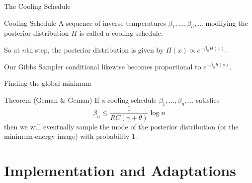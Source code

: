\documentclass[10pt]{beamer}
\begin{document}
\begin{frame}{The Cooling Schedule}

\begin{block}{Cooling Schedule}
A sequence of inverse temperatures $\beta_1,\ldots,\beta_n,\ldots$ modifying the posterior distribution $\Pi$ is called a cooling schedule.

So at $n$th step, the posterior distribution is given by $\Pi(x) \propto e^{-\beta_n H(x)}$.

Our Gibbs Sampler conditional likewise becomes proportional to $e^{-\beta_n h(s)}$.
\end{block}




\end{frame}

\begin{frame}{Finding the global minimum}
\begin{block}{Theorem (Geman \& Geman)}
If a cooling schedule $\beta_1,\ldots,\beta_n,\ldots$ satisfies
\[ \beta_n \leq \frac{1}{RC(\gamma+\theta)}\log n \]
then we will eventually sample the mode of the posterior distribution (or the minimum-energy image) with probability 1.
\end{block}
\end{frame}

\section{Implementation and Adaptations}
\end{document}
